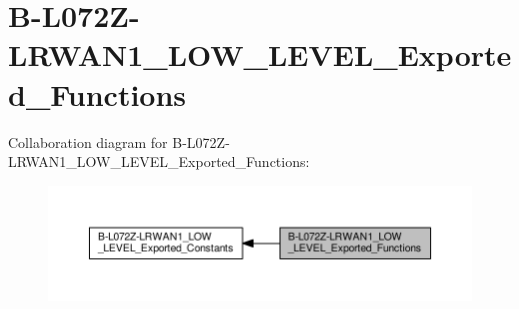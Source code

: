 \hypertarget{group__B-L072Z-LRWAN1__LOW__LEVEL__Exported__Functions}{}\section{B-\/\+L072\+Z-\/\+L\+R\+W\+A\+N1\+\_\+\+L\+O\+W\+\_\+\+L\+E\+V\+E\+L\+\_\+\+Exported\+\_\+\+Functions}
\label{group__B-L072Z-LRWAN1__LOW__LEVEL__Exported__Functions}
Collaboration diagram for B-\/\+L072\+Z-\/\+L\+R\+W\+A\+N1\+\_\+\+L\+O\+W\+\_\+\+L\+E\+V\+E\+L\+\_\+\+Exported\+\_\+\+Functions\+:
\nopagebreak
\begin{figure}[H]
\begin{center}
\leavevmode
\includegraphics[width=350pt]{group__B-L072Z-LRWAN1__LOW__LEVEL__Exported__Functions}
\end{center}
\end{figure}
